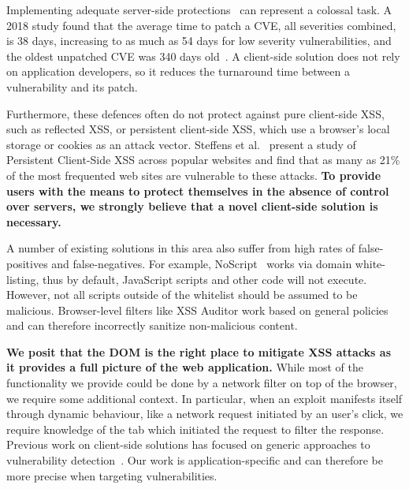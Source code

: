 Implementing adequate server-side protections~\cite{Xu:2006:TPE:1267336.1267345,DBLP:conf/sec/Nguyen-TuongGGSE05,Pietraszek:2005:DAI:2146257.2146267,Bisht:2008:XPD:1428322.1428325} can represent a colossal task. A 2018 study found that the average time to patch a \ac{CVE}, all severities combined, is 38 days, increasing to as much as 54 days for low severity vulnerabilities, and the oldest unpatched \ac{CVE} was 340
days old~\cite{Rapid7}. A client-side solution does not rely on
application developers, so it reduces the turnaround time
between a vulnerability and its patch.

Furthermore, these defences often do not protect against pure
client-side \ac{XSS}, such as reflected \ac{XSS}, or persistent
client-side \ac{XSS}, which use a browser's local storage or cookies
as an attack vector. Steffens et
al.~\cite{DBLP:conf/ndss/SteffensRJS19} present a study of Persistent
Client-Side \ac{XSS} across popular websites and find that as many as
21\% of the most frequented web sites are vulnerable to these attacks.
%
\textbf{To provide users with the means to protect themselves in the absence
of control over servers, we strongly believe that a novel client-side
solution is necessary.}

A number of existing solutions in this area also suffer from high
rates of false-positives and false-negatives. %
For example, NoScript~\cite{Noscript} works via domain white-listing, thus by
default, JavaScript scripts and other code will not execute. However,
not all scripts outside of the whitelist should be assumed to be
malicious. Browser-level filters like XSS Auditor work based on
general policies and can therefore incorrectly sanitize non-malicious
content.

\textbf{We posit that the DOM is the right place to mitigate XSS
  attacks as it provides a full picture of the web application.} While
most of the functionality we provide could be done by a network filter
on top of the browser, we require some additional context. In
particular, when an exploit manifests itself through dynamic
behaviour, like a network request initiated by an user's click, we
require knowledge of the tab which initiated the request to filter the
response. Previous work on client-side solutions has focused on
generic approaches to vulnerability
detection~\cite{Kirda:2009:CCS:2639535.2639808,Jim:2007:DSI:1242572.1242654,Hallaraker:2005:DMJ:1078029.1078861}. Our
work is application-specific and can therefore be more precise when
targeting vulnerabilities.

